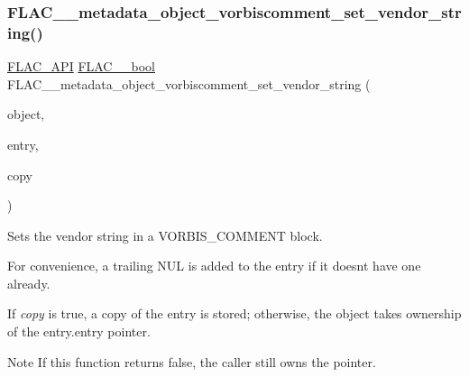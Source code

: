 \subsubsection{\texorpdfstring{FLAC\_\_metadata\_object\_vorbiscomment\_set\_vendor\_string()}{FLAC\_\_metadata\_object\_vorbiscomment\_set\_vendor\_string()}}
{\footnotesize\ttfamily \mbox{\hyperlink{group__flac__export_ga56ca07df8a23310707732b1c0007d6f5}{F\+L\+A\+C\+\_\+\+A\+PI}} \mbox{\hyperlink{ordinals_8h_a95103469f1cbd78b8cf250194985b34e}{F\+L\+A\+C\+\_\+\+\_\+bool}} F\+L\+A\+C\+\_\+\+\_\+metadata\+\_\+object\+\_\+vorbiscomment\+\_\+set\+\_\+vendor\+\_\+string (\begin{DoxyParamCaption}\item[{\mbox{\hyperlink{struct_f_l_a_c_____stream_metadata}{F\+L\+A\+C\+\_\+\+\_\+\+Stream\+Metadata}} $\ast$}]{object,  }\item[{\mbox{\hyperlink{struct_f_l_a_c_____stream_metadata___vorbis_comment___entry}{F\+L\+A\+C\+\_\+\+\_\+\+Stream\+Metadata\+\_\+\+Vorbis\+Comment\+\_\+\+Entry}}}]{entry,  }\item[{\mbox{\hyperlink{ordinals_8h_a95103469f1cbd78b8cf250194985b34e}{F\+L\+A\+C\+\_\+\+\_\+bool}}}]{copy }\end{DoxyParamCaption})}

Sets the vendor string in a V\+O\+R\+B\+I\+S\+\_\+\+C\+O\+M\+M\+E\+NT block.

For convenience, a trailing N\+UL is added to the entry if it doesn\textquotesingle{}t have one already.

If {\itshape copy} is {\ttfamily true}, a copy of the entry is stored; otherwise, the object takes ownership of the {\ttfamily entry.\+entry} pointer.

\begin{DoxyNote}{Note}
If this function returns {\ttfamily false}, the caller still owns the pointer.
\end{DoxyNote}

